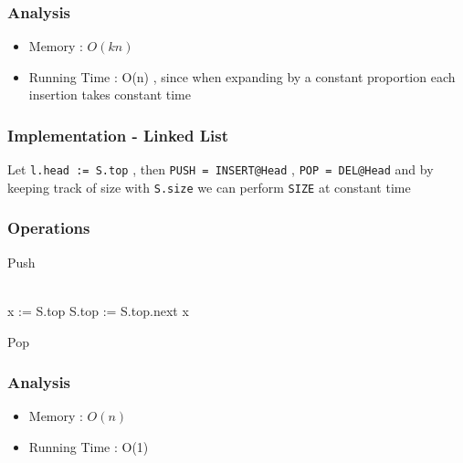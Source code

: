 		\subsubsection{Analysis}
						\begin{itemize}
								\item[] Memory : $O(kn)$
								\item[] Running Time : O(n) , since when expanding by a constant proportion each insertion takes  constant time
						\end{itemize}

		\subsubsection{Implementation - Linked List}
				\par{Let \texttt{l.head := S.top} , then \texttt{PUSH = INSERT@Head} , \texttt{POP = DEL@Head} and by keeping track of size with \texttt{S.size} we can perform \texttt{SIZE} at constant time}

		\subsubsection{Operations}

			\begin{algorithm}[H]
				\DontPrintSemicolon
				\SetAlgoLined{}
				\caption{Push}

			\end{algorithm}

		\begin{algorithm}[H]
				\DontPrintSemicolon
				\SetAlgoLined{}
				\\
					{x := S.top \;
					 S.top := S.top.next \;
					 \Return x
					}

				\caption{Pop}
		\end{algorithm}
	
		\subsubsection{Analysis}
						\begin{itemize}
								\item[] Memory : $O(n)$
								\item[] Running Time : O(1)
						\end{itemize}

